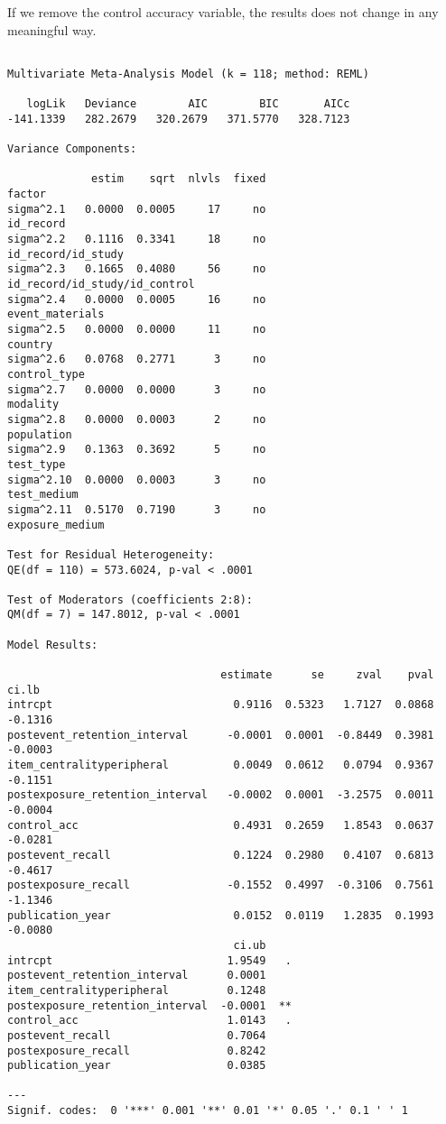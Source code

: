 \documentclass[
  letterpaper,
  DIV=11,
  numbers=noendperiod]{scrartcl}
\begin{document}
If we remove the control accuracy variable, the results does not change
in any meaningful way.

\begin{verbatim}

Multivariate Meta-Analysis Model (k = 118; method: REML)

   logLik   Deviance        AIC        BIC       AICc   
-141.1339   282.2679   320.2679   371.5770   328.7123   

Variance Components:

             estim    sqrt  nlvls  fixed                         factor 
sigma^2.1   0.0000  0.0005     17     no                      id_record 
sigma^2.2   0.1116  0.3341     18     no             id_record/id_study 
sigma^2.3   0.1665  0.4080     56     no  id_record/id_study/id_control 
sigma^2.4   0.0000  0.0005     16     no                event_materials 
sigma^2.5   0.0000  0.0000     11     no                        country 
sigma^2.6   0.0768  0.2771      3     no                   control_type 
sigma^2.7   0.0000  0.0000      3     no                       modality 
sigma^2.8   0.0000  0.0003      2     no                     population 
sigma^2.9   0.1363  0.3692      5     no                      test_type 
sigma^2.10  0.0000  0.0003      3     no                    test_medium 
sigma^2.11  0.5170  0.7190      3     no                exposure_medium 

Test for Residual Heterogeneity:
QE(df = 110) = 573.6024, p-val < .0001

Test of Moderators (coefficients 2:8):
QM(df = 7) = 147.8012, p-val < .0001

Model Results:

                                 estimate      se     zval    pval    ci.lb 
intrcpt                            0.9116  0.5323   1.7127  0.0868  -0.1316 
postevent_retention_interval      -0.0001  0.0001  -0.8449  0.3981  -0.0003 
item_centralityperipheral          0.0049  0.0612   0.0794  0.9367  -0.1151 
postexposure_retention_interval   -0.0002  0.0001  -3.2575  0.0011  -0.0004 
control_acc                        0.4931  0.2659   1.8543  0.0637  -0.0281 
postevent_recall                   0.1224  0.2980   0.4107  0.6813  -0.4617 
postexposure_recall               -0.1552  0.4997  -0.3106  0.7561  -1.1346 
publication_year                   0.0152  0.0119   1.2835  0.1993  -0.0080 
                                   ci.ub     
intrcpt                           1.9549   . 
postevent_retention_interval      0.0001     
item_centralityperipheral         0.1248     
postexposure_retention_interval  -0.0001  ** 
control_acc                       1.0143   . 
postevent_recall                  0.7064     
postexposure_recall               0.8242     
publication_year                  0.0385     

---
Signif. codes:  0 '***' 0.001 '**' 0.01 '*' 0.05 '.' 0.1 ' ' 1
\end{verbatim}
\end{document}
